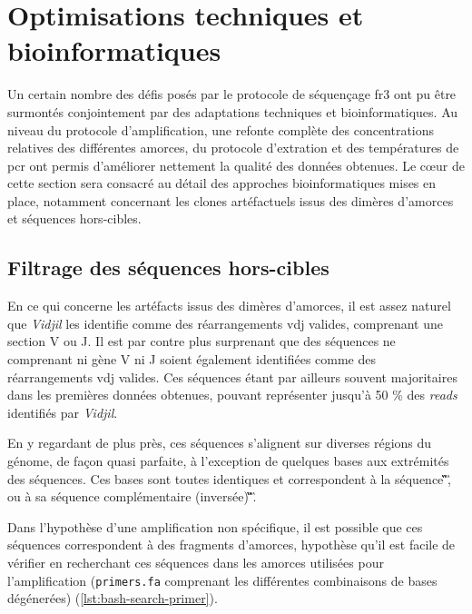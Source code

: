 \section{Optimisations techniques et bioinformatiques}

Un certain nombre des défis posés par le protocole de séquençage \gls{fr}3 ont
pu être surmontés conjointement par des adaptations techniques et
bioinformatiques. Au niveau du protocole d'amplification, une refonte complète
des concentrations relatives des différentes amorces, du protocole d'extration
et des températures de \gls{pcr} ont permis d'améliorer nettement la qualité
des données obtenues. Le cœur de cette section sera consacré au détail des
approches bioinformatiques mises en place, notamment concernant les clones
artéfactuels issus des dimères d'amorces et séquences hors-cibles.

\subsection{Filtrage des séquences hors-cibles}

En ce qui concerne les artéfacts issus des dimères d'amorces, il est assez
naturel que \textit{Vidjil} les identifie comme des réarrangements \gls{vdj}
valides, comprenant une section V ou J. Il est par contre plus surprenant que
des séquences ne comprenant ni gène V ni J soient également identifiées comme
des réarrangements \gls{vdj} valides. Ces séquences étant par ailleurs souvent
majoritaires dans les premières données obtenues, pouvant représenter jusqu'à
50 \% des \textit{reads} identifiés par \textit{Vidjil}.

\vspace{1em}

En y regardant de plus près, ces séquences s'alignent sur diverses régions du
génome, de façon quasi parfaite, à l'exception de quelques bases aux extrémités
des séquences. Ces bases sont toutes identiques et correspondent à la séquence
\C\G\T\C\T\C\C\T\C\A\G\G\T\A\A\G, ou à sa séquence complémentaire (inversée)
\C\T\T\A\C\C\T\G\A\G\G\A\G\A\C\G.

\vspace{1em}

Dans l'hypothèse d'une amplification non spécifique, il est possible que ces
séquences correspondent à des fragments d'amorces, hypothèse qu'il est facile
de vérifier en recherchant ces séquences dans les amorces utilisées pour
l'amplification (\texttt{primers.fa} comprenant les différentes combinaisons de
bases dégénerées) (\autoref{lst:bash-search-primer}).

